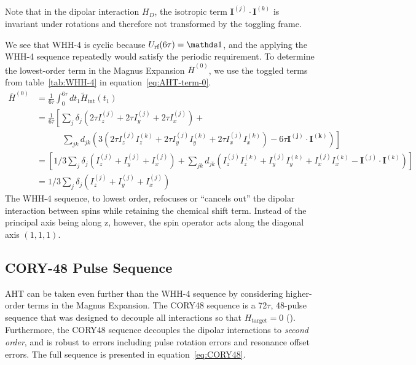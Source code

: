 Note that in the dipolar interaction $H_D$, the isotropic term $\mathbf{I}^{(j)} \cdot \mathbf{I}^{(k)}$ is invariant under rotations and therefore not transformed by the toggling frame.

We see that WHH-4 is cyclic because $U_{\text{rf}}(6\tau) = \identity$, and the applying the WHH-4 sequence repeatedly would satisfy the periodic requirement. To determine the lowest-order term in the Magnus Expansion $\overline{H}^{(0)}$, we use the toggled terms from table~\ref{tab:WHH-4} in equation~\ref{eq:AHT-term-0}.
\begin{align*}
    \overline{H}^{(0)} &= \frac{1}{6\tau} \int_0^{6\tau} dt_1
    \widetilde{H}_{\text{int}}(t_1) \\
    &= \frac{1}{6\tau} \left[
        \sum_j \delta_j \left(2\tau I_z^{(j)} + 2\tau I_y^{(j)} + 2\tau I_x^{(j)} \right) + \right. \\
        & \hspace{3em} \left. \sum_{jk} d_{jk} \left(3(
            2\tau I_z^{(j)}I_z^{(k)} + 2\tau I_y^{(j)}I_y^{(k)} + 2\tau I_x^{(j)}I_x^{(k)}
        ) - 6\tau \mathbf{I^{(j)}} \cdot \mathbf{I^{(k)}} \right)
    \right] \\
    &= \left[
        1/3 \sum_j \delta_j \left(I_z^{(j)} + I_y^{(j)} + I_x^{(j)} \right) +
        \sum_{jk} d_{jk} \left(I_z^{(j)}I_z^{(k)} + I_y^{(j)}I_y^{(k)} + I_x^{(j)}I_x^{(k)} - \mathbf{I}^{(j)} \cdot \mathbf{I}^{(k)} \right)
    \right] \\
    &= 1/3 \sum_j \delta_j \left(I_z^{(j)} + I_y^{(j)} + I_x^{(j)} \right)
\end{align*}
The WHH-4 sequence, to lowest order, refocuses or ``cancels out'' the dipolar interaction between spins while retaining the chemical shift term. Instead of the principal axis being along z, however, the spin operator acts along the diagonal axis $(1,1,1)$.

\subsection{CORY-48 Pulse Sequence}\label{subsec:CORY48}

AHT can be taken even further than the WHH-4 sequence by considering higher-order terms in the Magnus Expansion. The CORY48 sequence is a 72$\tau$, 48-pulse sequence that was designed to decouple all interactions so that $H_{\text{target}} = 0$ (\cite{CORY1990205}). Furthermore, the CORY48 sequence decouples the dipolar interactions to \emph{second order}, and is robust to errors including pulse rotation errors and resonance offset errors. The full sequence is presented in equation~\ref{eq:CORY48}.

